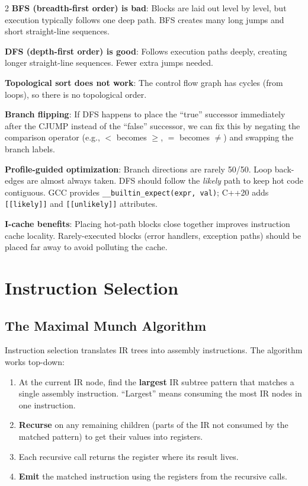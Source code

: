 \documentclass[9pt,landscape]{extarticle}
\begin{document}
\begin{multicols}{2}
\textbf{BFS (breadth-first order) is bad}: Blocks are laid out level by level, but execution typically follows one deep path. BFS creates many long jumps and short straight-line sequences.

\textbf{DFS (depth-first order) is good}: Follows execution paths deeply, creating longer straight-line sequences. Fewer extra jumps needed.

\textbf{Topological sort does not work}: The control flow graph has cycles (from loops), so there is no topological order.

\textbf{Branch flipping}: If DFS happens to place the ``true'' successor immediately after the CJUMP instead of the ``false'' successor, we can fix this by negating the comparison operator (e.g., $<$ becomes $\geq$, $=$ becomes $\neq$) and swapping the branch labels.

\textbf{Profile-guided optimization}: Branch directions are rarely 50/50. Loop back-edges are almost always taken. DFS should follow the \emph{likely} path to keep hot code contiguous. GCC provides \texttt{\_\_builtin\_expect(expr, val)}; C++20 adds \texttt{[[likely]]} and \texttt{[[unlikely]]} attributes.

\textbf{I-cache benefits}: Placing hot-path blocks close together improves instruction cache locality. Rarely-executed blocks (error handlers, exception paths) should be placed far away to avoid polluting the cache.

\section{Instruction Selection}

\subsection{The Maximal Munch Algorithm}

Instruction selection translates IR trees into assembly instructions. The algorithm works top-down:

\begin{enumerate}
  \item At the current IR node, find the \textbf{largest} IR subtree pattern that matches a single assembly instruction. ``Largest'' means consuming the most IR nodes in one instruction.
  \item \textbf{Recurse} on any remaining children (parts of the IR not consumed by the matched pattern) to get their values into registers.
  \item Each recursive call returns the register where its result lives.
  \item \textbf{Emit} the matched instruction using the registers from the recursive calls.
\end{enumerate}


\end{multicols}
\end{document}
